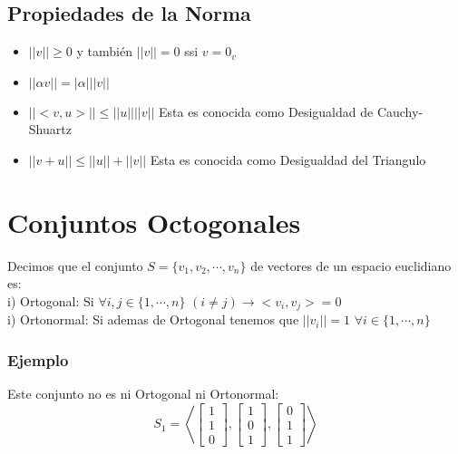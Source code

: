 \documentclass[12pt]{report}							    %
\begin{document}
        \subsection{Propiedades de la Norma}
        \begin{itemize}
            \item $||v|| \geq 0$ y también $||v|| = 0$ ssi $v = 0_v$   
            \item $|| \alpha v||  = |\alpha| ||v|| $
            \item $||<v, u>||  \leq ||u|| ||v|| $ Esta es conocida como Desigualdad de Cauchy-Shuartz
            \item $||v + u||  \leq ||u|| + ||v|| $ Esta es conocida como Desigualdad del Triangulo
        \end{itemize}



    \clearpage
    \section{Conjuntos Octogonales}

        Decimos que el conjunto $S = \{v_1, v_2, \cdots, v_n \}$ de vectores de un espacio euclidiano es: \\

        i) Ortogonal: Si $\forall i, j \in \{1, \cdots, n \}$ $(i\neq j) \to <v_i, v_j> = 0$ \\

        i) Ortonormal: Si ademas de Ortogonal tenemos que $||v_i|| = 1$ $\forall i\in \{1, \cdots, n \}$

        \subsubsection{Ejemplo}

        Este conjunto no es ni Ortogonal ni Ortonormal:
        \begin{equation*}
            S_1 = \left< \begin{bmatrix} 1\\1\\0\end{bmatrix} , \begin{bmatrix} 1\\0\\1\end{bmatrix}, \begin{bmatrix} 0\\1\\1\end{bmatrix} \right> 
        \end{equation*}
\end{document}
